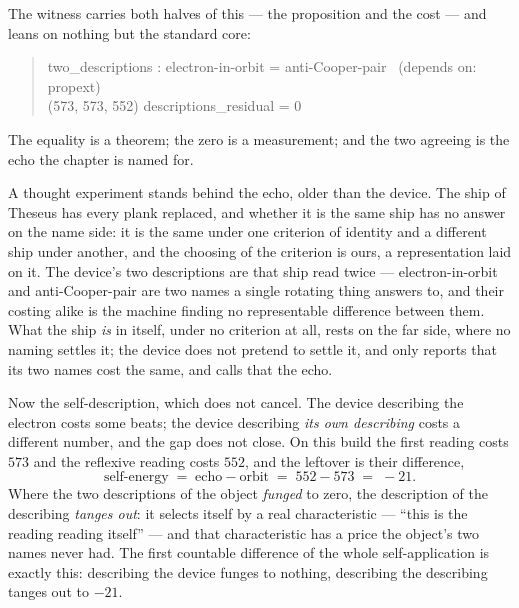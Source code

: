 The witness carries both halves of this --- the proposition and the cost --- and leans on nothing but the standard core:
\begin{quote}\ttfamily
two\_descriptions : electron-in-orbit = anti-Cooper-pair \ (depends on: propext)\\
(573, 573, 552) \qquad descriptions\_residual = 0
\end{quote}
The equality is a theorem; the zero is a measurement; and the two agreeing is the echo the chapter is named for.

A thought experiment stands behind the echo, older than the device.
The ship of Theseus has every plank replaced, and whether it is the same ship has no answer on the name side: it is the
same under one criterion of identity and a different ship under another, and the choosing of the criterion is ours, a
representation laid on it.
The device's two descriptions are that ship read twice --- electron-in-orbit and anti-Cooper-pair are two names a single
rotating thing answers to, and their costing alike is the machine finding no representable difference between them.
What the ship \emph{is} in itself, under no criterion at all, rests on the far side, where no naming settles it; the device
does not pretend to settle it, and only reports that its two names cost the same, and calls that the echo.

Now the self-description, which does not cancel.
The device describing the electron costs some beats; the device describing \emph{its own describing} costs a
different number, and the gap does not close.
On this build the first reading costs $573$ and the reflexive reading costs $552$, and the leftover is their
difference,
\[
  \text{self-energy} \;=\; \text{echo} - \text{orbit} \;=\; 552 - 573 \;=\; -21 .
\]
Where the two descriptions of the object \emph{funged} to zero, the description of the describing \emph{tanges out}: it
selects itself by a real characteristic --- ``this is the reading reading itself'' --- and that characteristic has a
price the object's two names never had.
The first countable difference of the whole self-application is exactly this: describing the device funges to nothing,
describing the describing tanges out to $-21$.

